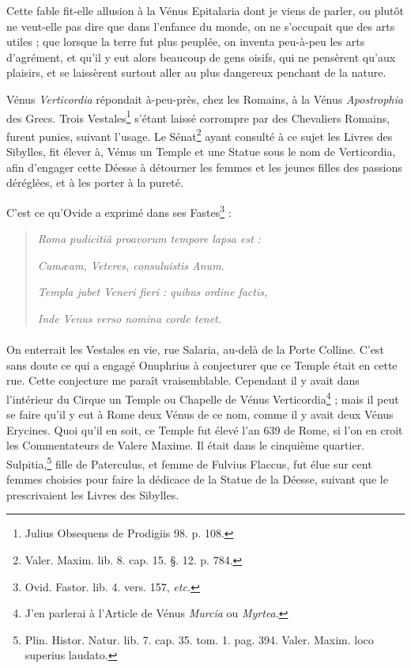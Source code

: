 \documentclass[a4paper, 11pt, oneside, polutonikogreek, french]{article}
\begin{document}
Cette fable fit-elle allusion à la Vénus Epitalaria dont je viens de parler, ou plutôt ne veut-elle pas dire que dans l'enfance du monde, on ne s'occupait que des arts utiles ; que lorsque la terre fut plus peuplée, on inventa peu-à-peu les arts d'agrément, et qu'il y eut alors beaucoup de gens oisifs, qui ne pensèrent qu'aux plaisirs, et se laissèrent surtout aller au plus dangereux penchant de la nature.

Vénus \emph{Verticordia} répondait à-peu-près, chez les Romains, à la Vénus \emph{Apostrophia} des Grecs. Trois Vestales\footnote{Julius Obsequens de Prodigiis 98. p. 108.} s'étant laissé corrompre par des Chevaliers Romains, furent punies, suivant l'usage. Le Sénat\footnote{Valer. Maxim. lib. 8. cap. 15. §. 12. p. 784.} ayant consulté à ce sujet les Livres des Sibylles, fit élever à, Vénus un Temple et une Statue sous le nom de Verticordia, afin d'engager cette Déesse à détourner les femmes et les jeunes filles des passions déréglées, et à les porter à la pureté.

C'est ce qu'Ovide a exprimé dans ses Fastes\footnote{Ovid. Fastor. lib. 4. vers. 157, \emph{etc.}} :
\begin{quotation}
\emph{Roma pudicitiâ proavorum tempore lapsa est :}

\hspace*{5mm}\emph{Cumæam, Veteres, consuluistis Anum.}

\emph{Templa jubet Veneri fieri : quibus ordine factis,}

\hspace*{5mm}\emph{Inde Venus verso nomina corde tenet.}
\end{quotation}
\paragraph{}
On enterrait les Vestales en vie, rue Salaria, au-delà de la Porte Colline. C'est sans doute ce qui a engagé Onuphrius à conjecturer que ce Temple était en cette rue. Cette conjecture me paraît vraisemblable. Cependant il y avait dans l'intérieur du Cirque un Temple ou Chapelle de Vénus Verticordia\footnote{J'en parlerai à l'Article de Vénus \emph{Murcia} ou \emph{Myrtea}.} ; mais il peut se faire qu'il y eut à Rome deux Vénus de ce nom, comme il y avait deux Vénus Erycines. Quoi qu'il en soit, ce Temple fut élevé l'an 639 de Rome, si l'on en croit les Commentateurs de Valere Maxime. Il était dans le cinquième quartier. Sulpitia,\footnote{Plin. Histor. Natur. lib. 7. cap. 35. tom. 1. pag. 394. Valer. Maxim. loco superius laudato.} fille de Paterculus, et femme de Fulvius Flaccus, fut élue sur cent femmes choisies pour faire la dédicace de la Statue de la Déesse, suivant que le prescrivaient les Livres des Sibylles.
\end{document}
